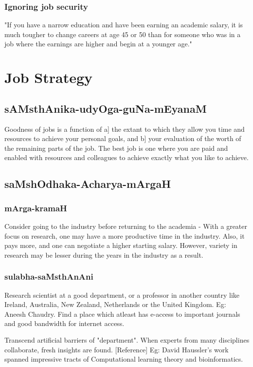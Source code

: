 \documentclass[oneside, article]{memoir}
\begin{document}
\subsection{Ignoring job security}
"If you have a narrow education and have been earning an academic salary, it is much tougher to change careers at age 45 or 50 than for someone who was in a job where the earnings are higher and begin at a younger age."

\chapter{Job Strategy}
\section{sAMsthAnika-udyOga-guNa-mEyanaM}
Goodness of jobs is a function of a] the extant to which they allow you time and resources to achieve your personal goals, and b] your evaluation of the worth of the remaining parts of the job. The best job is one where you are paid and enabled with resources and colleagues to achieve exactly what you like to achieve.

\section{saMshOdhaka-Acharya-mArgaH}
\subsection{mArga-kramaH}
Consider going to the industry before returning to the academia - With a greater focus on research, one may have a more productive time in the industry. Also, it pays more, and one can negotiate a higher starting salary. However, variety in research may be lesser during the years in the industry as a result.

\subsection{sulabha-saMsthAnAni}
\subitem Research scientist at a good department, or a professor in another country like Ireland, Australia, New Zealand, Netherlands or the United Kingdom.
\subsubitem Eg: Aneesh Chaudry.
\subitem Find a place which atleast has e-access to important journals and good bandwidth for internet access.

Transcend artificial barriers of "department". When experts from many disciplines collaborate, fresh insights are found. [Reference]
\subitem Eg: David Haussler's work spanned impressive tracts of Computational learning theory and bioinformatics.
\end{document}
